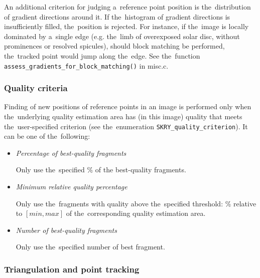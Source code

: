 \documentclass[12pt]{article}
\newcommand{\nbd}{\nobreakdash}
\begin{document}
An additional criterion for judging a~reference point position is the~distribution of gradient directions around it.
If the~histogram of gradient directions is insufficiently filled, the~position is rejected. For instance, if the~image
is locally dominated by a~single edge (e.g. the~limb of overexposed solar disc, without prominences or resolved
spicules), should block matching be performed, the~tracked point would jump along the~edge. See the~function
\lstinline$assess_gradients_for_block_matching()$ in {\ttfamily misc.c}.

\subsubsection{Quality criteria}\label{sec:quality_criteria}

Finding of new positions of reference points in an image is performed only when the~underlying quality estimation area
has (in this image) quality that meets the~user-specified criterion (see the~enumeration
\lstinline$SKRY_quality_criterion$). It can be one of the~following:

\begin{itemize}
\item \emph{Percentage of best-quality fragments}
\nopagebreak

Only use the~specified \% of the best\nbd-quality fragments.

\item \emph{Minimum relative quality percentage}
\nopagebreak

Only use the~fragments with quality above the~specified threshold: \% relative to $[min, max]$ of the~corresponding
quality estimation area.

\item \emph{Number of best-quality fragments}

Only use the~specified number of best fragment.

\end{itemize}

\subsubsection{Triangulation and point tracking}\label{sec:triangulation}
\end{document}
